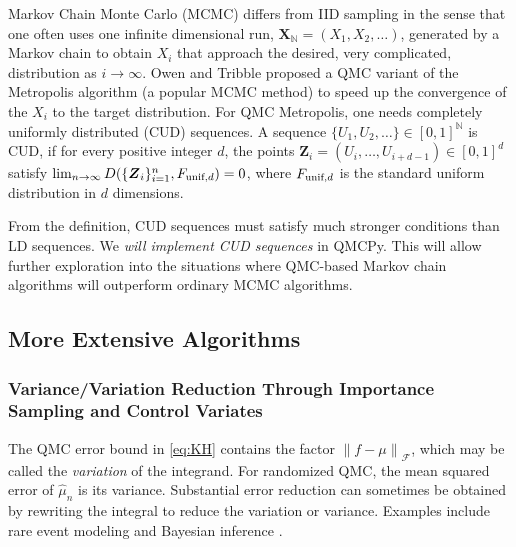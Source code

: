 \documentclass[11pt]{NSFamsart}
\newcommand{\unif}{\textup{unif}}
\newcommand{\naturals}{{\mathbb{N}}}
\newcommand{\bX}{{\boldsymbol{X}}}
\newcommand{\bZ}{{\boldsymbol{Z}}}
\newcommand{\calf}{{\mathcal{F}}}
\newcommand{\norm}[2][{}]{\ensuremath{\left \lVert #2 \right \rVert}_{#1}}
\newcommand{\hmu}{\hat{\mu}}
\begin{document}
Markov Chain Monte Carlo (MCMC) differs from IID sampling in the sense that one often uses one infinite dimensional run, $\bX_{\naturals} = (X_1, X_2, \dots)$, generated by a Markov chain to obtain $X_i$ that approach the desired, very complicated, distribution as $i \to \infty$.  Owen and Tribble \cite{OweTri05a} proposed a QMC variant of the Metropolis algorithm (a popular MCMC method) to speed up the convergence of the $X_i$ to the target distribution.  For QMC Metropolis, one needs completely uniformly distributed (CUD) sequences.  A sequence $\{U_1, U_2, \ldots \} \in [0, 1]^{\naturals}$  is CUD, if for every positive integer $d$, the points $\bZ_i = (U_{i}, \ldots, U_{i+d-1}) \in [0, 1]^d$ satisfy $\lim_{n \to \infty} D(\{ \bZ_i\}_{i=1}^n,F_{\unif,d}) = 0$, where $F_{\unif,d}$  is the standard uniform distribution in $d$ dimensions.

From the definition, CUD  sequences must satisfy much stronger conditions than LD sequences.  We \emph{will implement CUD sequences} in QMCPy.  This will allow further exploration into the situations where QMC-based Markov chain algorithms will outperform ordinary MCMC algorithms.


\subsection{More Extensive Algorithms}


\subsubsection{Variance/Variation Reduction Through Importance Sampling and Control Variates}
The QMC error bound in \eqref{eq:KH} contains the factor $\norm[\calf]{f - \mu}$, which may be called the \emph{variation} of the integrand.  For randomized QMC, the mean squared error of $\hmu_n$ is its variance.  Substantial error reduction can sometimes be obtained by rewriting the integral to reduce the variation or variance.  Examples include rare event modeling \cite{rubino2009rare} and Bayesian inference \cite{salmeron2000importance}.
\end{document}
